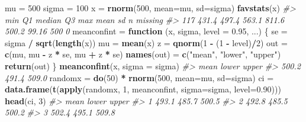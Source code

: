 \documentclass[]{book}
\makeatletter
\newenvironment{Shaded}{\begin{snugshade}}{\end{snugshade}}
\newcommand{\KeywordTok}[1]{\textcolor[rgb]{0.13,0.29,0.53}{\textbf{#1}}}
\newcommand{\DataTypeTok}[1]{\textcolor[rgb]{0.13,0.29,0.53}{#1}}
\newcommand{\DecValTok}[1]{\textcolor[rgb]{0.00,0.00,0.81}{#1}}
\newcommand{\FloatTok}[1]{\textcolor[rgb]{0.00,0.00,0.81}{#1}}
\newcommand{\StringTok}[1]{\textcolor[rgb]{0.31,0.60,0.02}{#1}}
\newcommand{\CommentTok}[1]{\textcolor[rgb]{0.56,0.35,0.01}{\textit{#1}}}
\newcommand{\ControlFlowTok}[1]{\textcolor[rgb]{0.13,0.29,0.53}{\textbf{#1}}}
\newcommand{\OperatorTok}[1]{\textcolor[rgb]{0.81,0.36,0.00}{\textbf{#1}}}
\newcommand{\NormalTok}[1]{#1}
\newenvironment{kframe}{%
\medskip{}
\setlength{\fboxsep}{.8em}
 \def\at@end@of@kframe{}%
 \ifinner\ifhmode%
  \def\at@end@of@kframe{\end{minipage}}%
  \begin{minipage}{\columnwidth}%
 \fi\fi%
 \def\FrameCommand##1{\hskip\@totalleftmargin \hskip-\fboxsep
 \colorbox{shadecolor}{##1}\hskip-\fboxsep
     \hskip-\linewidth \hskip-\@totalleftmargin \hskip\columnwidth}%
 \MakeFramed {\advance\hsize-\width
   \@totalleftmargin\z@ \linewidth\hsize
   \@setminipage}}%
 {\par\unskip\endMakeFramed%
 \at@end@of@kframe}
\renewenvironment{Shaded}{\begin{kframe}}{\end{kframe}}
\makeatother
\begin{document}
\begin{Shaded}
\begin{Highlighting}[]
\NormalTok{mu =}\StringTok{ }\DecValTok{500}
\NormalTok{sigma =}\StringTok{ }\DecValTok{100}
\NormalTok{x =}\StringTok{ }\KeywordTok{rnorm}\NormalTok{(}\DecValTok{500}\NormalTok{, }\DataTypeTok{mean=}\NormalTok{mu, }\DataTypeTok{sd=}\NormalTok{sigma)}
\KeywordTok{favstats}\NormalTok{(x)}
\CommentTok{#>  min    Q1 median    Q3   max  mean    sd   n missing}
\CommentTok{#>  117 431.4  497.4 563.1 811.6 500.2 99.16 500       0}
\NormalTok{meanconfint =}\StringTok{ }\ControlFlowTok{function}\NormalTok{ (x, sigma, }\DataTypeTok{level =} \FloatTok{0.95}\NormalTok{, ...) \{}
\NormalTok{  se =}\StringTok{ }\NormalTok{sigma }\OperatorTok{/}\StringTok{ }\KeywordTok{sqrt}\NormalTok{(}\KeywordTok{length}\NormalTok{(x))}
\NormalTok{  mu =}\StringTok{ }\KeywordTok{mean}\NormalTok{(x)}
\NormalTok{  z =}\StringTok{ }\KeywordTok{qnorm}\NormalTok{(}\DecValTok{1} \OperatorTok{-}\StringTok{ }\NormalTok{(}\DecValTok{1} \OperatorTok{-}\StringTok{ }\NormalTok{level)}\OperatorTok{/}\DecValTok{2}\NormalTok{)}
\NormalTok{  out =}\StringTok{ }\KeywordTok{c}\NormalTok{(mu, mu }\OperatorTok{-}\StringTok{ }\NormalTok{z }\OperatorTok{*}\StringTok{ }\NormalTok{se, mu }\OperatorTok{+}\StringTok{ }\NormalTok{z }\OperatorTok{*}\StringTok{ }\NormalTok{se)}
  \KeywordTok{names}\NormalTok{(out) =}\StringTok{ }\KeywordTok{c}\NormalTok{(}\StringTok{"mean"}\NormalTok{, }\StringTok{"lower"}\NormalTok{, }\StringTok{"upper"}\NormalTok{)}
  \KeywordTok{return}\NormalTok{(out)}
\NormalTok{\}}
\KeywordTok{meanconfint}\NormalTok{(x, }\DataTypeTok{sigma =}\NormalTok{ sigma)}
\CommentTok{#>  mean lower upper }
\CommentTok{#> 500.2 491.4 509.0}
\NormalTok{randomx =}\StringTok{ }\KeywordTok{do}\NormalTok{(}\DecValTok{50}\NormalTok{) }\OperatorTok{*}\StringTok{ }\KeywordTok{rnorm}\NormalTok{(}\DecValTok{500}\NormalTok{, }\DataTypeTok{mean=}\NormalTok{mu, }\DataTypeTok{sd=}\NormalTok{sigma)}
\NormalTok{ci =}\StringTok{ }\KeywordTok{data.frame}\NormalTok{(}\KeywordTok{t}\NormalTok{(}\KeywordTok{apply}\NormalTok{(randomx, }\DecValTok{1}\NormalTok{, meanconfint, }\DataTypeTok{sigma=}\NormalTok{sigma, }\DataTypeTok{level=}\FloatTok{0.90}\NormalTok{)))}
\KeywordTok{head}\NormalTok{(ci, }\DecValTok{3}\NormalTok{)}
\CommentTok{#>    mean lower upper}
\CommentTok{#> 1 493.1 485.7 500.5}
\CommentTok{#> 2 492.8 485.5 500.2}
\CommentTok{#> 3 502.4 495.1 509.8}


\end{Highlighting}
\end{Shaded}
\end{document}
